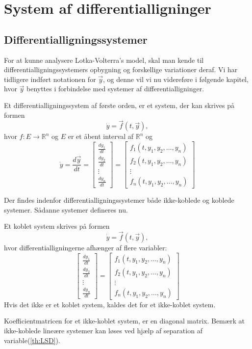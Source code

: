 \chapter{System af differentialligninger}

\section{Differentialligningssystemer}
For at kunne analysere Lotka-Volterra's model, skal man kende til differentialligningssystemers opbygning og forskellige variationer deraf. Vi har tidligere indført notationen for $\vec y$, og denne vil vi nu videreføre i følgende kapitel, hvor $\vec y$ benyttes i forbindelse med systemer af differentialligninger. 

\begin{definition} \label{ikke-lin.diff}
Et differentialligningssystem af første orden, er et system, der kan skrives på formen
$$\dot{y}=\vec{f}(t, \vec{y}),$$
hvor $f: E \to \mathbb{R}^n$ og $E$ er et åbent interval af $\mathbb{R}^n$ og
$$\dot{y} = \frac{d\vec{y}}{dt} = 
\begin{bmatrix}
\frac{dy_1}{dt} \\
\frac{dy_2}{dt}\\
\vdots \\
\frac{dy_n}{dt}
\end{bmatrix}
=
\begin{bmatrix}
f_1(t, y_1, y_2, \hdots, y_n)\\
f_2(t, y_1, y_2, \hdots, y_n)\\
\vdots \\
f_n(t, y_1, y_2, \hdots, y_n)
\end{bmatrix}$$
\end{definition}

Der findes indenfor differentialligningssystemer både ikke-koblede og koblede systemer. Sådanne systemer defineres nu.
\begin{definition}
Et koblet system skrives på formen
$$\dot{y}=\vec{f}(t,\vec{y}),$$ hvor differentialligningerne afhænger af flere variabler:
$$\begin{bmatrix}
\frac{dy_1}{dt} \\
\frac{dy_2}{dt}\\
\vdots \\
\frac{dy_n}{dt}
\end{bmatrix}
=
\begin{bmatrix}
f_1(t, y_1, y_2, \hdots, y_n)\\
f_2(t, y_1, y_2, \hdots, y_n)\\
\vdots \\
f_n(t, y_1, y_2, \hdots, y_n)
\end{bmatrix}$$
Hvis det ikke er et koblet system, kaldes det for et ikke-koblet system.
\end{definition}
Koefficientmatricen for et ikke-koblet system, er en diagonal matrix. Bemærk at ikke-koblede lineære systemer kan løses ved hjælp af separation af variable(\ref{th:LSD}).

